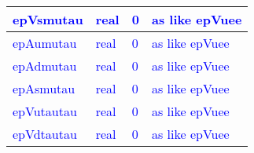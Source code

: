 \documentclass{article}
\begin{document}
\begin{longtable}{llll}
\midrule
\textcolor{blue}{epVsmutau} & \begin{minipage}[t]{2cm}\textcolor{blue}{real}\end{minipage} & \begin{minipage}[t]{2cm}\textcolor{blue}{0}\end{minipage} & \begin{minipage}[t]{12cm}\textcolor{blue}{as like epVuee}\end{minipage}\\*
\midrule
\textcolor{blue}{epAumutau} & \begin{minipage}[t]{2cm}\textcolor{blue}{real}\end{minipage} & \begin{minipage}[t]{2cm}\textcolor{blue}{0}\end{minipage} & \begin{minipage}[t]{12cm}\textcolor{blue}{as like epVuee}\end{minipage}\\*
\midrule
\textcolor{blue}{epAdmutau} & \begin{minipage}[t]{2cm}\textcolor{blue}{real}\end{minipage} & \begin{minipage}[t]{2cm}\textcolor{blue}{0}\end{minipage} & \begin{minipage}[t]{12cm}\textcolor{blue}{as like epVuee}\end{minipage}\\*
\midrule
\textcolor{blue}{epAsmutau} & \begin{minipage}[t]{2cm}\textcolor{blue}{real}\end{minipage} & \begin{minipage}[t]{2cm}\textcolor{blue}{0}\end{minipage} & \begin{minipage}[t]{12cm}\textcolor{blue}{as like epVuee}\end{minipage}\\*
\midrule
\textcolor{blue}{epVutautau} & \begin{minipage}[t]{2cm}\textcolor{blue}{real}\end{minipage} & \begin{minipage}[t]{2cm}\textcolor{blue}{0}\end{minipage} & \begin{minipage}[t]{12cm}\textcolor{blue}{as like epVuee}\end{minipage}\\*
\midrule
\textcolor{blue}{epVdtautau} & \begin{minipage}[t]{2cm}\textcolor{blue}{real}\end{minipage} & \begin{minipage}[t]{2cm}\textcolor{blue}{0}\end{minipage} & \begin{minipage}[t]{12cm}\textcolor{blue}{as like epVuee}\end{minipage}\\*

\end{longtable}
\end{document}
